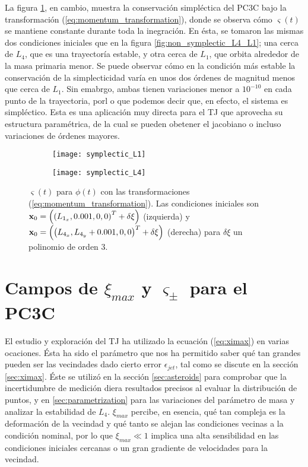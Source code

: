 La figura \ref{fig:symplectic_L4_L1}, en cambio, muestra la conservación simpléctica del PC3C bajo la transformación (\ref{eq:momentum_transformation}), donde se observa cómo $\varsigma(t)$ se mantiene constante durante toda la inegración. En ésta, se tomaron las mismas dos condiciones iniciales que en la figura \ref{fig:non_symplectic_L4_L1}; una cerca de $L_4$, que es una trayectoría estable, y otra cerca de $L_1$, que orbita alrededor de la masa primaria menor. Se puede observar cómo en la condición más estable la conservación de la simplecticidad varía en unos dos órdenes de magnitud menos que cerca de $L_1$. Sin emabrgo, ambas tienen variaciones menor a $10^{-10}$ en cada punto de la trayectoria, porl o que podemos decir que, en efecto, el sistema es simpléctico. Esta es una aplicación muy directa para el TJ que aprovecha su estructura paramétrica, de la cual se pueden obetener el jacobiano o incluso variaciones de órdenes mayores. 

\begin{figure}[h!]
\centering
\begin{subfigure}{0.49\textwidth}
	\centering
	\texttt{[image: symplectic\_L1]}
\end{subfigure}
%
\begin{subfigure}{0.49\textwidth}
	\centering
	\texttt{[image: symplectic\_L4]}
\end{subfigure}
\caption{$\varsigma(t)$ para $\phi(t)$ con las transformaciones (\ref{eq:momentum_transformation}). Las condiciones iniciales son $\mathbf{x}_0 = \left( \left( L_{1_x}, 0.001, 0, 0 \right)^T + \delta \xi \right) $ (izquierda) y $ \mathbf{x}_0 = \left( \left( L_{4_x}, L_{4_y} + 0.001, 0, 0 \right)^T + \delta \xi \right) $ (derecha) para $\delta \xi$ un polinomio de orden $3$.}
\label{fig:symplectic_L4_L1}
\end{figure}


\section{Campos de $\xi_{max}$ y $\varsigma_\pm$ para el PC3C}
\label{sec:C3BP_heatmaps}

El estudio y exploración del TJ ha utilizado la ecuación (\ref{eq:ximax}) en varias ocaciones. Ésta ha sido el parámetro que nos ha permitido saber qué tan grandes pueden ser las vecindades dado cierto error $\epsilon_{jet}$, tal como se discute en la sección \ref{sec:ximax}. Éste se utilizó en la sección \ref{sec:asteroids} para comprobar que la incertidumbre de medición diera resultados precisos al evaluar la distribución de puntos, y en \ref{sec:parametrization} para las variaciones del parámetro de masa y analizar la estabilidad de $L_4$. $\xi_{max}$ percibe, en esencia, qué tan compleja es la deformación de la vecindad y qué tanto se alejan las condiciones vecinas a la condición nominal, por lo que $\xi_{max} \ll 1$ implica una alta sensibilidad en las condiciones iniciales cercanas o un gran gradiente de velocidades para la vecindad. 

